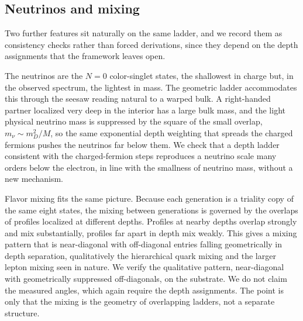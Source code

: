\subsection{Neutrinos and mixing}

Two further features sit naturally on the same ladder, and we record them as consistency checks rather than forced
derivations, since they depend on the depth assignments that the framework leaves open.

The neutrinos are the $N = 0$ color-singlet states, the shallowest in charge but, in the observed spectrum, the
lightest in mass. The geometric ladder accommodates this through the seesaw \cite{randall1999} reading natural to a
warped bulk. A right-handed partner localized very deep in the interior has a large bulk mass, and the light physical
neutrino mass is suppressed by the square of the small overlap, $m_\nu \sim m_D^2 / M$, so the same exponential depth
weighting that spreads the charged fermions pushes the neutrinos far below them. We check that a depth ladder
consistent with the charged-fermion steps reproduces a neutrino scale many orders below the electron, in line with the
smallness of neutrino mass, without a new mechanism.

Flavor mixing fits the same picture. Because each generation is a triality copy of the same eight states, the mixing
between generations is governed by the overlaps of profiles localized at different depths. Profiles at nearby depths
overlap strongly and mix substantially, profiles far apart in depth mix weakly. This gives a mixing pattern that is
near-diagonal with off-diagonal entries falling geometrically in depth separation, qualitatively the hierarchical quark
mixing and the larger lepton mixing seen in nature. We verify the qualitative pattern, near-diagonal with
geometrically suppressed off-diagonals, on the substrate. We do not claim the measured angles, which again require the
depth assignments. The point is only that the mixing is the geometry of overlapping ladders, not a separate
structure.
